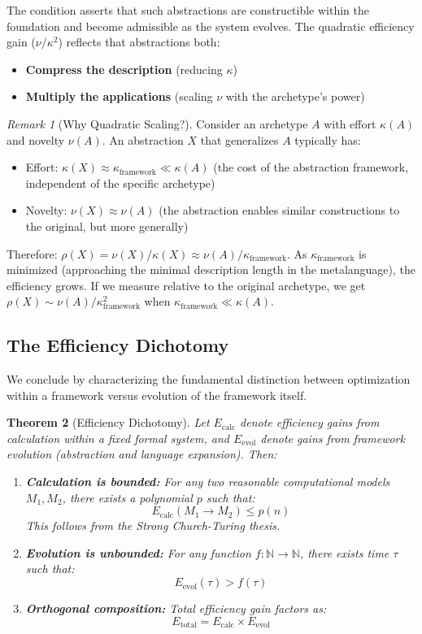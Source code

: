 \documentclass[11pt]{article}
\newtheorem{theorem}{Theorem}[section]
\theoremstyle{definition}
\theoremstyle{remark}
\newtheorem{remark}[theorem]{Remark}
\newcommand{\N}{\mathbb{N}}
\begin{document}
The condition asserts that such abstractions are constructible within the foundation and become admissible as the system evolves. The quadratic efficiency gain ($\nu/\kappa^2$) reflects that abstractions both:
\begin{itemize}
\item \textbf{Compress the description} (reducing $\kappa$)
\item \textbf{Multiply the applications} (scaling $\nu$ with the archetype's power)
\end{itemize}

\begin{remark}[Why Quadratic Scaling?]
Consider an archetype $A$ with effort $\kappa(A)$ and novelty $\nu(A)$. An abstraction $X$ that generalizes $A$ typically has:
\begin{itemize}
\item Effort: $\kappa(X) \approx \kappa_{\text{framework}} \ll \kappa(A)$ (the cost of the abstraction framework, independent of the specific archetype)
\item Novelty: $\nu(X) \approx \nu(A)$ (the abstraction enables similar constructions to the original, but more generally)
\end{itemize}
Therefore: $\rho(X) = \nu(X)/\kappa(X) \approx \nu(A)/\kappa_{\text{framework}}$. As $\kappa_{\text{framework}}$ is minimized (approaching the minimal description length in the metalanguage), the efficiency grows. If we measure relative to the original archetype, we get $\rho(X) \sim \nu(A)/\kappa_{\text{framework}}^2$ when $\kappa_{\text{framework}} \ll \kappa(A)$.
\end{remark}

\subsection{The Efficiency Dichotomy}

We conclude by characterizing the fundamental distinction between optimization within a framework versus evolution of the framework itself.

\begin{theorem}[Efficiency Dichotomy]
\label{thm:efficiency-dichotomy}
Let $E_{\text{calc}}$ denote efficiency gains from calculation within a fixed formal system, and $E_{\text{evol}}$ denote gains from framework evolution (abstraction and language expansion). Then:
\begin{enumerate}
\item \textbf{Calculation is bounded:} For any two reasonable computational models $M_1, M_2$, there exists a polynomial $p$ such that:
\[
E_{\text{calc}}(M_1 \to M_2) \leq p(n)
\]
This follows from the Strong Church-Turing thesis.

\item \textbf{Evolution is unbounded:} For any function $f : \N \to \N$, there exists time $\tau$ such that:
\[
E_{\text{evol}}(\tau) > f(\tau)
\]

\item \textbf{Orthogonal composition:} Total efficiency gain factors as:
\[
E_{\text{total}} = E_{\text{calc}} \times E_{\text{evol}}
\]
\end{enumerate}
\end{theorem}
\end{document}
